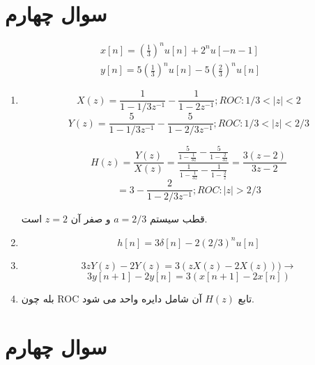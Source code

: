 \documentclass[12pt]{article}
\begin{document}
\section{سوال چهارم}
$$
\begin{array}{l}
	x[n]=\left(\frac{1}{3}\right)^{n} u[n]+2^{n} u[-n-1] \\
	y[n]=5\left(\frac{1}{3}\right)^{n} u[n]-5\left(\frac{2}{3}\right)^{n} u[n]
\end{array}
$$



\begin{enumerate}[label = \Alph*)]
	\item 

$$X(z) = \frac{1}{1-1/3 z^{-1}} - \frac{1}{1- 2 z^{-1}} ; ROC: 1/3<|z|<2$$
$$Y(z)= \frac{5}{1 - 1/3 z^{-1}} - \frac{5}{1 - 2/3 z^{-1}} ; ROC: 1/3 < |z| <2/3$$

$$H(z) = \frac{Y(z)}{X(z)} =\frac{\frac{5}{1-\frac{1}{3 z}}-\frac{5}{1-\frac{2}{3 z}}}{\frac{1}{1-\frac{1}{3 z}}-\frac{1}{1-\frac{2}{z}}} =\frac{3 (z-2)}{3 z-2}$$
$$=3 - \frac{2}{1 - 2/3 z^{-1}} ; ROC: |z| > 2/3  $$


قطب سیستم $a = 2/3$ و صفر آن $z=2$ است.


\item
$$h[n] = 3\delta[n] - 2 (2/3)^n u[n]$$


\item

$$3z Y(z) -2 Y(z) = 3(zX(z) - 2 X(z))) \rightarrow$$
$$3 y[n+1] - 2y[n] = 3(x[n+1] - 2x[n])$$

\item

بله چون ROC تابع $H(z)$ آن شامل دایره واحد می شود.
\end{enumerate}

\section{سوال چهارم}
\end{document}
